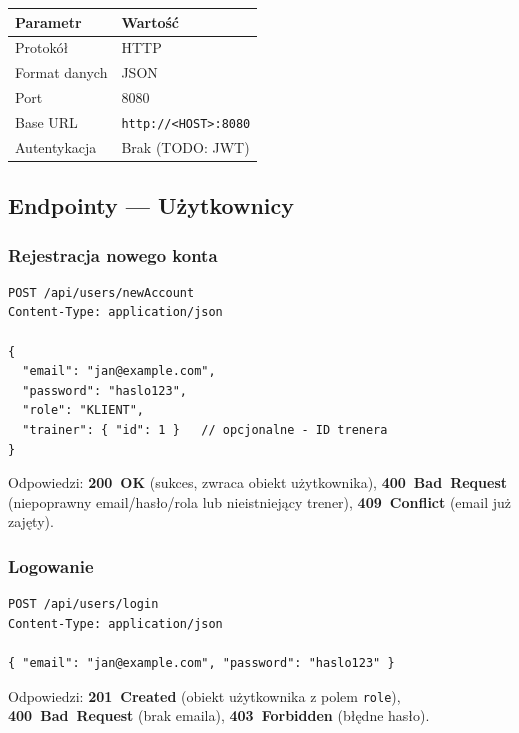 \documentclass[12pt,a4paper]{article}
\begin{document}
\begin{center}
\begin{tabular}{ll}
  \toprule
  \textbf{Parametr} & \textbf{Wartość} \\
  \midrule
  Protokół      & HTTP \\
  Format danych & JSON \\
  Port          & 8080 \\
  Base URL      & \texttt{http://<HOST>:8080} \\
  Autentykacja  & Brak (TODO: JWT) \\
  \bottomrule
\end{tabular}
\end{center}

\newpage
\subsection{Endpointy --- Użytkownicy}

\subsubsection{Rejestracja nowego konta}

\begin{lstlisting}[caption={POST /api/users/newAccount}]
POST /api/users/newAccount
Content-Type: application/json

{
  "email": "jan@example.com",
  "password": "haslo123",
  "role": "KLIENT",
  "trainer": { "id": 1 }   // opcjonalne - ID trenera
}
\end{lstlisting}

Odpowiedzi: \textbf{200~OK} (sukces, zwraca obiekt użytkownika), \textbf{400~Bad~Request} (niepoprawny email/hasło/rola lub nieistniejący trener), \textbf{409~Conflict} (email już zajęty).

\subsubsection{Logowanie}

\begin{lstlisting}[caption={POST /api/users/login}]
POST /api/users/login
Content-Type: application/json

{ "email": "jan@example.com", "password": "haslo123" }
\end{lstlisting}

Odpowiedzi: \textbf{201~Created} (obiekt użytkownika z polem \texttt{role}), \textbf{400~Bad~Request} (brak emaila), \textbf{403~Forbidden} (błędne hasło).
\end{document}
